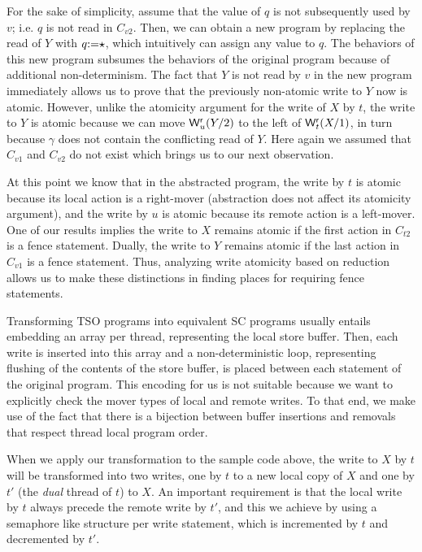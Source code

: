 \documentclass[preprint,9pt]{sigplanconf}
\begin{document}
For the sake of simplicity, assume that the value of $q$ is not subsequently used by $v$; i.e. $q$ is not read in $C_{v2}$.
Then, we can obtain a new program by replacing the read of $Y$ with $q\mathtt{:=}\star$, which intuitively can assign any value to $q$.
The behaviors of this new program subsumes the behaviors of the original program because of additional non-determinism. 
The fact that $Y$ is not read by $v$ in the new program immediately allows us to prove that the previously non-atomic write to $Y$ now is atomic. 
However, unlike the atomicity argument for the write of $X$ by $t$, the write to $Y$ is atomic because we can move $\mathsf{W}^{\mathsf{r}}_{u}(Y/2)$ to the left of $\mathsf{W}^{\mathsf{r}}_{t}(X/1)$, in turn because $\gamma$ does not contain the conflicting read of $Y$. 
Here again we assumed that $C_{v1}$ and $C_{v2}$ do not exist which brings us to our next observation.

At this point we know that in the abstracted program, the write by $t$ is atomic because its local action is a right-mover (abstraction does not affect its atomicity argument), and the write by $u$ is atomic because its remote action is a left-mover.
One of our results implies the write to $X$ remains atomic if the first action in $C_{t2}$ is a fence statement.
Dually, the write to $Y$ remains atomic if the last action in $C_{v1}$ is a fence statement.
Thus, analyzing write atomicity based on reduction allows us to make these distinctions in finding places for requiring fence statements.

Transforming TSO programs into equivalent SC programs usually entails embedding an array per thread, representing the local store buffer.
Then, each write is inserted into this array and a non-deterministic loop, representing flushing of the contents of the store buffer, is placed between each statement of the original program.
This encoding for us is not suitable because we want to explicitly check the mover types of local and remote writes. 
To that end, we make use of the fact that there is a bijection between buffer insertions and removals that respect thread local program order.

When we apply our transformation to the sample code above, the write to $X$ by $t$ will be transformed into two writes, one by $t$ to a new local copy of $X$ and one by $t'$ (the {\em dual} thread of $t$) to $X$.
An important requirement is that the local write by $t$ always precede the remote write by $t'$, and this we achieve by using a semaphore like structure per write statement, which is incremented by $t$ and decremented by $t'$. 
\end{document}
